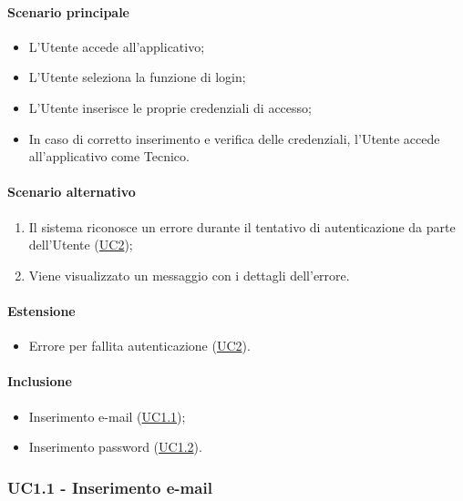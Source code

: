 \paragraph*{Scenario principale}
\begin{itemize}
  \item L’Utente accede all’applicativo;
  \item L’Utente seleziona la funzione di login;
  \item L’Utente inserisce le proprie credenziali di accesso;
  \item In caso di corretto inserimento e verifica delle credenziali, l’Utente accede all’applicativo come Tecnico.
\end{itemize}

\paragraph*{Scenario alternativo}
\begin{enumerate}
  \item Il sistema riconosce un errore durante il tentativo di autenticazione da parte dell'Utente (\hyperref[UC2]{UC2});
  \item Viene visualizzato un messaggio con i dettagli dell'errore.
\end{enumerate}

\paragraph*{Estensione}
\begin{itemize}
  \item Errore per fallita autenticazione (\hyperref[UC2]{UC2}).
\end{itemize}

\paragraph*{Inclusione}
\begin{itemize}
  \item Inserimento e-mail (\hyperref[UC1point1]{UC1.1});
  \item Inserimento password (\hyperref[UC1point2]{UC1.2}).
\end{itemize}


\subsubsection{UC1.1 - Inserimento e-mail}\label{UC1point1}

